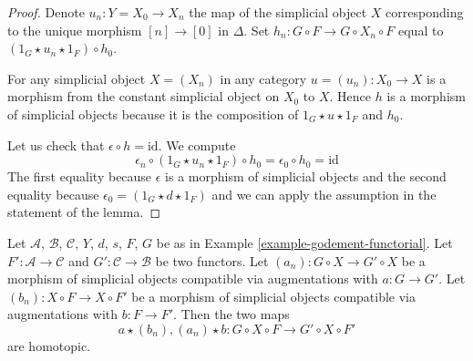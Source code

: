 \begin{proof}
Denote $u_n : Y = X_0 \to X_n$ the map of the simplicial object $X$
corresponding to the unique morphism $[n] \to [0]$ in $\Delta$.
Set $h_n : G \circ F \to G \circ X_n \circ F$ equal to
$(1_G \star u_n \star 1_F) \circ h_0$.

\medskip\noindent
For any simplicial object $X = (X_n)$ in any category
$u =(u_n) : X_0 \to X$ is a morphism from the constant simplicial object
on $X_0$ to $X$. Hence $h$ is a
morphism of simplicial objects because it is the composition of
$1_G \star u \star 1_F$ and $h_0$.

\medskip\noindent
Let us check that $\epsilon \circ h = \text{id}$. We compute
$$
\epsilon_n \circ (1_G \star u_n \star 1_F) \circ h_0 =
\epsilon_0 \circ h_0 = \text{id}
$$
The first equality because $\epsilon$ is a morphism of simplicial objects
and the second equality because
$\epsilon_0 = (1_G \star d \star 1_F)$ and we can apply the
assumption in the statement of the lemma.
\end{proof}

\begin{lemma}
\label{lemma-godement-two-maps}
Let $\mathcal{A}$, $\mathcal{B}$, $\mathcal{C}$, $Y$, $d$, $s$, $F$, $G$
be as in Example \ref{example-godement-functorial}. Let
$F' : \mathcal{A} \to \mathcal{C}$ and
$G' : \mathcal{C} \to \mathcal{B}$ be two functors.
Let $(a_n) : G \circ X \to G' \circ X$ be a morphism of simplicial objects
compatible via augmentations with $a : G \to G'$.
Let $(b_n) : X \circ F \to X \circ F'$ be a morphism of simplicial objects
compatible via augmentations with $b : F \to F'$. Then the two maps
$$
a \star (b_n), (a_n) \star b : G \circ X \circ F \to G' \circ X \circ F'
$$
are homotopic.
\end{lemma}

